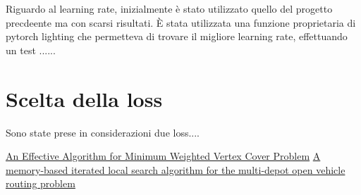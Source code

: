 \documentclass[11pt]{article}
\begin{document}
Riguardo al learning rate, inizialmente è stato utilizzato quello del progetto precdeente ma con scarsi risultati. È stata utilizzata una funzione proprietaria di pytorch lighting che permetteva di trovare il migliore learning rate, effettuando un test ......



\section{Scelta della loss}

Sono state prese in considerazioni due loss....


\pagebreak

\begin{thebibliography}{5}


 \href{https://www.researchgate.net/publication/242463011_An_Effective_Algorithm_for_Minimum_Weighted_Vertex_Cover_problem}{An Effective Algorithm for Minimum Weighted Vertex Cover Problem}
 \href{https://www.sciencedirect.com/science/article/abs/pii/S0377221720300278}{A memory-based iterated local search algorithm for the multi-depot open vehicle routing problem}

\end{thebibliography}


\pagebreak
\end{document}
